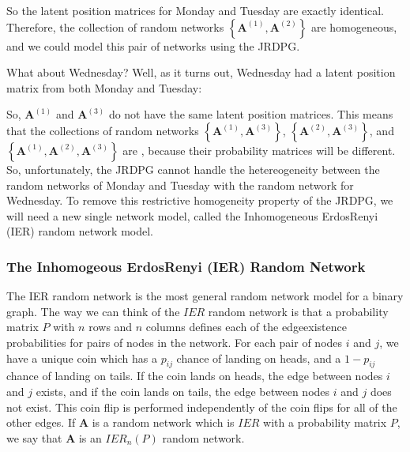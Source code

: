 \documentclass[letterpaper,10pt,english]{jupyterBook}
\begin{document}
\noindent{}

\sphinxAtStartPar
So the latent position matrices for Monday and Tuesday are exactly identical. Therefore, the collection of random networks \(\left\{\mathbf A^{(1)}, \mathbf A^{(2)}\right\}\) are homogeneous, and we could model this pair of networks using the JRDPG.

\sphinxAtStartPar
What about Wednesday? Well, as it turns out, Wednesday had a  latent position matrix from both Monday and Tuesday:

\noindent{}

\sphinxAtStartPar
So, \(\mathbf A^{(1)}\) and \(\mathbf A^{(3)}\) do not have the same latent position matrices. This means that the collections of random networks \(\left\{\mathbf A^{(1)}, \mathbf A^{(3)}\right\}\), \(\left\{\mathbf A^{(2)}, \mathbf A^{(3)}\right\}\), and \(\left\{\mathbf A^{(1)}, \mathbf A^{(2)}, \mathbf A^{(3)}\right\}\) are , because their probability matrices will be different. So, unfortunately, the JRDPG cannot handle the hetereogeneity between the random networks of Monday and Tuesday with the random network for Wednesday. To remove this restrictive homogeneity property of the JRDPG, we will need a new single network model, called the Inhomogeneous Erdos\sphinxhyphen{}Renyi (IER) random network model.


\subsubsection{The Inhomogeous Erdos\sphinxhyphen{}Renyi (IER) Random Network}
\label{\detokenize{representations/ch5/multi-network-models:the-inhomogeous-erdos-renyi-ier-random-network}}
\sphinxAtStartPar
The IER random network is the most general random network model for a binary graph. The way we can think of the \(IER\) random network is that a probability matrix \(P\) with \(n\) rows and \(n\) columns defines each of the edge\sphinxhyphen{}existence probabilities for pairs of nodes in the network. For each pair of nodes \(i\) and \(j\), we have a unique coin which has a \(p_{ij}\) chance of landing on heads, and a \(1 - p_{ij}\) chance of landing on tails. If the coin lands on heads, the edge between nodes \(i\) and \(j\) exists, and if the coin lands on tails, the edge between nodes \(i\) and \(j\) does not exist. This coin flip is performed independently of the coin flips for all of the other edges. If \(\mathbf A\) is a random network which is \(IER\) with a probability matrix \(P\), we say that \(\mathbf A\) is an \(IER_n(P)\) random network.
\end{document}
